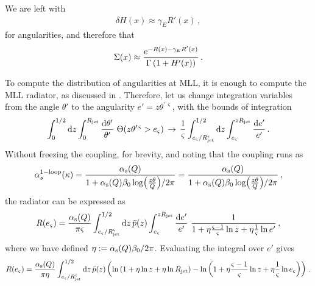 \begin{enumerate}[label=\alph*)]
        \begin{answer}
            We are left with
            \begin{align}
                \delta H(x) \approx \gamma_E R'(x)
                \,,
            \end{align}
            for angularities, and therefore that
            \begin{align}
                \label{eq:soln-multiple-emissions}
                \Sigma(x) \approx \frac{e^{-R(x) - \gamma_E R'(x)}}{\Gamma\le(1 + H'(x)\ri)}
                \,.
            \end{align}
        \end{answer}
\end{enumerate}


To compute the distribution of angularities at MLL, it is enough to compute the MLL radiator, as discussed in .
%
Therefore, let us change integration variables from the angle \(\theta'\) to the angularity \(e' = z \theta^{\prime\,\varsigma}\), with the bounds of integration
\begin{align}
    \int_0^{1/2} \dd z \int_0^{R_\text{jet}} \frac{\dd\theta'}{\theta'}
    \,\,
    \Theta(z\theta^{\prime\,\varsigma} > e_\varsigma)
    \,
    \to
    \,
    \frac{1}{\varsigma}
    \int_{e_\varsigma/R_\text{jet}^\varsigma}^{1/2}
    \dd z
    \int_{e_\varsigma}^{zR_\text{jet}} \frac{\dd e'}{e'}
    \,.
\end{align}
Without freezing the coupling, for brevity, and noting that the coupling runs as
\begin{align}
    \alpha^{\rm 1-loop}_s(\kappa)
    =
    \frac{\alpha_{\mathrm{s}}(Q)}{1 + \alpha_{\mathrm{s}}(Q) \beta_0 \log(\frac{z\theta}{Q})/2\pi}
    =
    \frac{\alpha_{\mathrm{s}}(Q)}{1 + \alpha_{\mathrm{s}}(Q) \beta_0 \log(\frac{z\theta}{Q})/2\pi}
    \,,
\end{align}
the radiator can be expressed as
\begin{align}
    R(e_\varsigma)
    =
    \frac{\alpha_{\mathrm{s}}(Q)}{\pi\varsigma}
    \int_{e_\varsigma/R_\text{jet}^\varsigma}^{1/2}
    \dd z\, \bar{p}(z)
    \int_{e_\varsigma}^{zR_\text{jet}} \frac{\dd e'}{e'}
    \,\,
    \frac{1}{1 + \eta\frac{\varsigma-1}{\varsigma}\ln z + \eta\frac{1}{\varsigma} \ln e'}
    \,,
\end{align}
where we have defined \(\eta := \alpha_{\mathrm{s}}(Q)\beta_0/2\pi\).
%
Evaluating the integral over \(e'\) gives
\begin{align}
    R(e_\varsigma)
    =
    \frac{\alpha_{\mathrm{s}}(Q)}{\pi\eta}
    \int_{e_\varsigma/R_\text{jet}^\varsigma}^{1/2}
    \dd z\, \bar{p}(z)
    \left(
        \ln\left(1 + \eta\ln z + \eta\ln R_\text{jet}\right)
        -
        \ln\left(1 + \eta\frac{\varsigma-1}{\varsigma}\ln z + \eta\frac{1}{\varsigma}\ln e_\varsigma\right)
    \right)
    \,.
\end{align}

